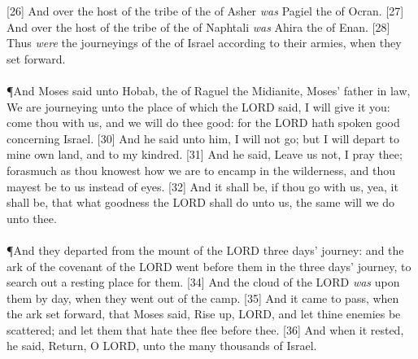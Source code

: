 [26] \textcolor[cmyk]{0.99998,1,0,0}{And over the host of the tribe of the  of Asher \emph{was} Pagiel the  of Ocran.}
[27] \textcolor[cmyk]{0.99998,1,0,0}{And over the host of the tribe of the  of Naphtali \emph{was} Ahira the  of Enan.}
[28] \textcolor[cmyk]{0.99998,1,0,0}{Thus \emph{were} the journeyings of the  of Israel according to their armies, when they set forward.}\\
\\
\P \textcolor[cmyk]{0.99998,1,0,0}{And Moses said unto Hobab, the  of Raguel the Midianite, Moses' father in law, We are journeying unto the place of which the LORD said, I will give it you: come thou with us, and we will do thee good: for the LORD hath spoken good concerning Israel.}
[30] \textcolor[cmyk]{0.99998,1,0,0}{And he said unto him, I will not go; but I will depart to mine own land, and to my kindred.}
[31] \textcolor[cmyk]{0.99998,1,0,0}{And he said, Leave us not, I pray thee; forasmuch as thou knowest how we are to encamp in the wilderness, and thou mayest be to us instead of eyes.}
[32] \textcolor[cmyk]{0.99998,1,0,0}{And it shall be, if thou go with us, yea, it shall be, that what goodness the LORD shall do unto us, the same will we do unto thee.}\\
\\
\P \textcolor[cmyk]{0.99998,1,0,0}{And they departed from the mount of the LORD three days' journey: and the ark of the covenant of the LORD went before them in the three days' journey, to search out a resting place for them.}
[34] \textcolor[cmyk]{0.99998,1,0,0}{And the cloud of the LORD \emph{was} upon them by day, when they went out of the camp.}
[35] \textcolor[cmyk]{0.99998,1,0,0}{And it came to pass, when the ark set forward, that Moses said, Rise up, LORD, and let thine enemies be scattered; and let them that hate thee flee before thee.}
[36] \textcolor[cmyk]{0.99998,1,0,0}{And when it rested, he said, Return, O LORD, unto the many thousands of Israel.}